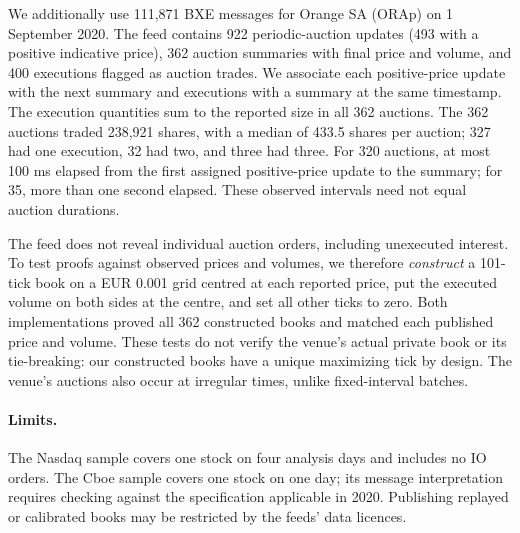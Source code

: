 We additionally use 111,871 BXE messages for Orange SA (ORAp) on 1 September 2020. The feed contains 922 periodic-auction updates (493 with a positive indicative price), 362 auction summaries with final price and volume, and 400 executions flagged as auction trades. We associate each positive-price update with the next summary and executions with a summary at the same timestamp. The execution quantities sum to the reported size in all 362 auctions. The 362 auctions traded 238,921 shares, with a median of 433.5 shares per auction; 327 had one execution, 32 had two, and three had three. For 320 auctions, at most 100 ms elapsed from the first assigned positive-price update to the summary; for 35, more than one second elapsed. These observed intervals need not equal auction durations.

The feed does not reveal individual auction orders, including unexecuted interest. To test proofs against observed prices and volumes, we therefore \emph{construct} a 101-tick book on a EUR 0.001 grid centred at each reported price, put the executed volume on both sides at the centre, and set all other ticks to zero. Both implementations proved all 362 constructed books and matched each published price and volume. These tests do not verify the venue's actual private book or its tie-breaking: our constructed books have a unique maximizing tick by design. The venue's auctions also occur at irregular times, unlike fixed-interval batches.

\paragraph{Limits.}
The Nasdaq sample covers one stock on four analysis days and includes no IO orders. The Cboe sample covers one stock on one day; its message interpretation requires checking against the specification applicable in 2020. Publishing replayed or calibrated books may be restricted by the feeds' data licences.
